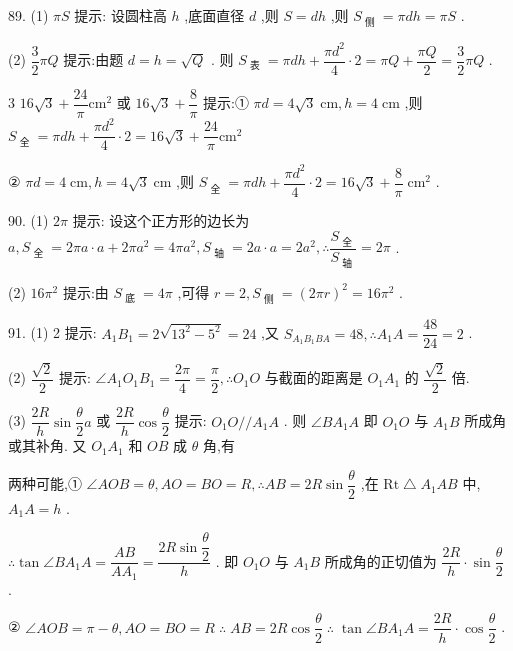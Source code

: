 89. (1) ${\pi S}$ 提示: 设圆柱高 $h$ ,底面直径 $d$ ,则 $S = {dh}$ ,则 ${S}_{\text{ 侧 }} = {\pi dh} = {\pi S}$ .

(2) $\dfrac{3}{2}{\pi Q}$ 提示:由题 $d = h = \sqrt{Q}$ . 则 ${S}_{\text{ 表 }} = {\pi dh} + \dfrac{\pi {d}^{2}}{4} \cdot  2 = {\pi Q} + \dfrac{\pi Q}{2} = \dfrac{3}{2}{\pi Q}$ .

3 ${16}\sqrt{3} + \dfrac{24}{\pi }{\mathrm{{cm}}}^{2}$ 或 ${16}\sqrt{3} + \dfrac{8}{\pi }$ 提示:① ${\pi d} = 4\sqrt{3}\mathrm{\;{cm}},h = 4\mathrm{\;{cm}}$ ,则 ${S}_{\text{ 全 }} = {\pi dh} + \dfrac{\pi {d}^{2}}{4} \cdot  2 = {16}\sqrt{3} + \dfrac{24}{\pi }{\mathrm{{cm}}}^{2}$

② ${\pi d} = 4\mathrm{\;{cm}},h = 4\sqrt{3}\mathrm{\;{cm}}$ ,则 ${S}_{\text{ 全 }} = {\pi dh} + \dfrac{\pi {d}^{2}}{4} \cdot  2 = {16}\sqrt{3} + \dfrac{8}{\pi }{\mathrm{\;{cm}}}^{2}$ .

90. (1) ${2\pi }$ 提示: 设这个正方形的边长为 $a,{S}_{\text{ 全 }} = {2\pi a} \cdot  a + {2\pi }{a}^{2} = {4\pi }{a}^{2},{S}_{\text{ 轴 }} = {2a} \cdot  a = 2{a}^{2},\therefore \dfrac{{S}_{\text{ 全 }}}{{S}_{\text{ 轴 }}} = {2\pi }$ .

(2) ${16}{\pi }^{2}$ 提示:由 ${S}_{\text{ 底 }} = {4\pi }$ ,可得 $r = 2,{S}_{\text{ 侧 }} = {\left( 2\pi r\right) }^{2} = {16}{\pi }^{2}$ .

91. (1) 2 提示: ${A}_{1}{B}_{1} = 2\sqrt{{13}^{2} - {5}^{2}} = {24}$ ,又 ${S}_{{A}_{1}{B}_{1}{BA}} = {48},\therefore {A}_{1}A = \dfrac{48}{24} = 2$ .

(2) $\dfrac{\sqrt{2}}{2}$ 提示: $\angle {A}_{1}{O}_{1}{B}_{1} = \dfrac{2\pi }{4} = \dfrac{\pi }{2},\therefore {O}_{1}O$ 与截面的距离是 ${O}_{1}{A}_{1}$ 的 $\dfrac{\sqrt{2}}{2}$ 倍.

(3) $\dfrac{2R}{h}\sin \dfrac{\theta }{2}a$ 或 $\dfrac{2R}{h}\cos \dfrac{\theta }{2}$ 提示: ${O}_{1}O//{A}_{1}A$ . 则 $\angle B{A}_{1}A$ 即 ${O}_{1}O$ 与 ${A}_{1}B$ 所成角或其补角. 又 ${O}_{1}{A}_{1}$ 和 ${OB}$ 成 $\theta$ 角,有

两种可能,① $\angle {AOB} = \theta ,{AO} = {BO} = R,\therefore {AB} = {2R}\sin \dfrac{\theta }{2}$ ,在 $\mathrm{{Rt}} \bigtriangleup  {A}_{1}{AB}$ 中, ${A}_{1}A = h$ .

$\therefore \tan \angle B{A}_{1}A = \dfrac{AB}{A{A}_{1}} = \dfrac{{2R}\sin \dfrac{\theta }{2}}{h}$ . 即 ${O}_{1}O$ 与 ${A}_{1}B$ 所成角的正切值为 $\dfrac{2R}{h} \cdot  \sin \dfrac{\theta }{2}$ .

② $\angle {AOB} = \pi  - \theta ,{AO} = {BO} = R\;\therefore \;{AB} = {2R}\cos \dfrac{\theta }{2}\;\therefore \;\tan \angle B{A}_{1}A = \dfrac{2R}{h} \cdot  \cos \dfrac{\theta }{2}$ .

